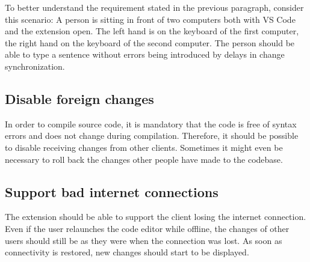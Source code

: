 To better understand the requirement stated in the previous paragraph, consider this scenario:
A person is sitting in front of two computers both with VS Code and the extension open. The left hand is on the keyboard of the first computer, the right hand on the keyboard of the second computer. The person should be able to type a sentence without errors being introduced by delays in change synchronization.

\subsection{Disable foreign changes}

In order to compile source code, it is mandatory that the code is free of syntax errors and does not change during compilation. Therefore, it should be possible to disable receiving changes from other clients. Sometimes it might even be necessary to roll back the changes other people have made to the codebase.

\subsection{Support bad internet connections}

The extension should be able to support the client losing the internet connection. Even if the user relaunches the code editor while offline, the changes of other users should still be as they were when the connection was lost. As soon as connectivity is restored, new changes should start to be displayed. 